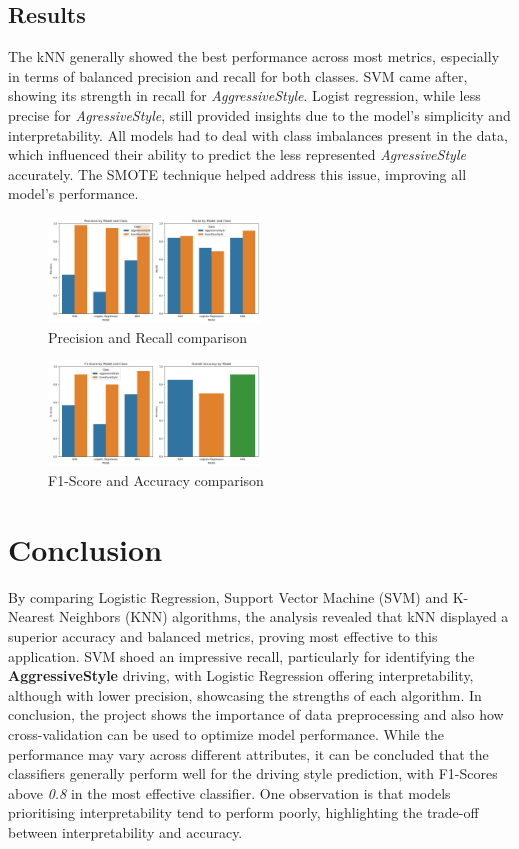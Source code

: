 \documentclass[10pt,journal,compsoc]{IEEEtran}
\begin{document}
\subsection{Results}
The kNN generally showed the best performance across most metrics, especially in terms of balanced precision and recall for both classes. SVM came after, 
showing its strength in recall for \textit{AggressiveStyle}. Logist regression, while less precise for \textit{AgressiveStyle}, still provided insights due 
to the model's simplicity and interpretability. All models had to deal with class imbalances present in the data, which influenced their ability to predict the less represented 
\textit{AgressiveStyle} accurately. The SMOTE technique helped address this issue, improving all model's performance. 

\begin{figure}[h]
    \centering
    \includegraphics[width=0.5\textwidth]{images/comparison1.png}
    \caption{Precision and Recall comparison}
    \label{fig:enter-label}
\end{figure}

\begin{figure}[h]
    \centering
    \includegraphics[width=0.5\textwidth]{images/comparison2.png}
    \caption{F1-Score and Accuracy comparison}
    \label{fig:enter-label}
\end{figure}

\section{Conclusion}
By comparing Logistic Regression, Support Vector Machine (SVM) and K-Nearest Neighbors (KNN) algorithms, the analysis revealed that kNN displayed a superior accuracy and balanced metrics, proving most effective to this application. SVM shoed an impressive recall, particularly for identifying the \textbf{AggressiveStyle} driving, with Logistic Regression offering interpretability, although with lower precision, showcasing the strengths of each algorithm.
In conclusion, the project shows the importance of data preprocessing and also how cross-validation can be used to optimize model performance. While the performance may vary across different attributes, it can be concluded that the classifiers generally perform well for the driving style prediction, with F1-Scores above \textit{0.8} in the most effective classifier. One observation is that models prioritising interpretability tend to perform poorly, highlighting the trade-off between interpretability and accuracy.

\printbibliography
\end{document}
